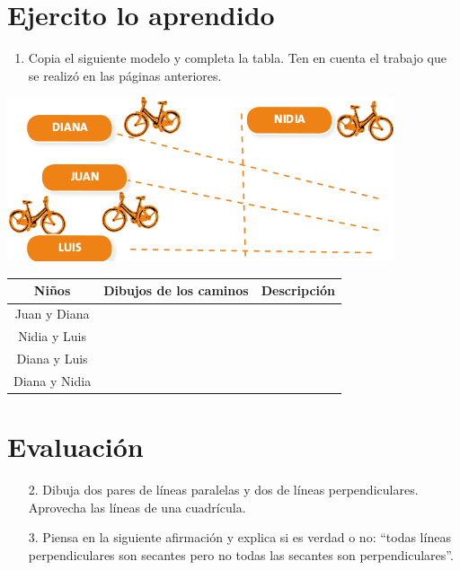\documentclass[twoside]{article}
\begin{document}
\section*{Ejercito lo aprendido}
\begin{enumerate}
\item Copia el siguiente modelo y completa la tabla. Ten en cuenta el trabajo que se realizó en las páginas anteriores.
\end{enumerate}
\begin{center}
\includegraphics[scale=.55]{Images/Carreras_biciletas2.png}
\end{center}
\begin{center}
\begin{tabular}{|c|c|c|}
\hline 
\hspace*{20pt} Niños & Dibujos de los caminos & Descripción \\ 
\hline 
Juan y Diana &  &  \\ 
\hline 
Nidia y Luis &  &  \\ 
\hline 
Diana y Luis &  &  \\ 
\hline 
Diana y Nidia &  &  \\ 
\hline 
\end{tabular}
\end{center}
\section*{Evaluaci\'on}
\begin{itemize}
\item[2.] Dibuja dos pares de líneas paralelas y dos de líneas perpendiculares. Aprovecha las líneas de una cuadrícula.
\item[3.] Piensa en la siguiente afirmación y explica si es verdad o no: “todas líneas perpendiculares son secantes pero no todas las secantes son perpendiculares”.
\end{itemize}
\end{document}
